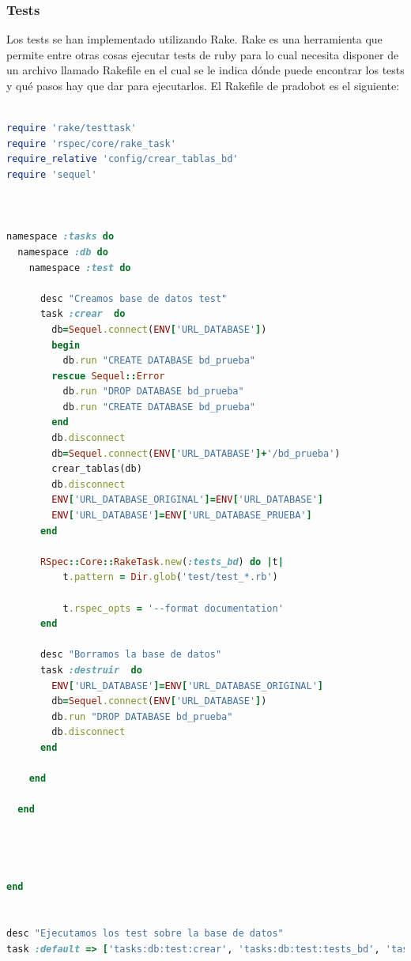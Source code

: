 \subsubsection{Tests}


Los tests se han implementado utilizando Rake. Rake es una herramienta que permite entre otras cosas ejecutar tests de ruby para lo cual necesita disponer de un archivo llamado Rakefile en el cual se le indica dónde puede encontrar los tests y qué pasos hay que dar para ejecutarlos. El Rakefile de pradobot es el siguiente:

\begin{lstlisting}[language=Ruby]

require 'rake/testtask'
require 'rspec/core/rake_task'
require_relative 'config/crear_tablas_bd'
require 'sequel'



namespace :tasks do
  namespace :db do
    namespace :test do

      desc "Creamos base de datos test"
      task :crear  do
        db=Sequel.connect(ENV['URL_DATABASE'])
        begin
          db.run "CREATE DATABASE bd_prueba"
        rescue Sequel::Error
          db.run "DROP DATABASE bd_prueba"
          db.run "CREATE DATABASE bd_prueba"
        end
        db.disconnect
        db=Sequel.connect(ENV['URL_DATABASE']+'/bd_prueba')
        crear_tablas(db)
        db.disconnect
        ENV['URL_DATABASE_ORIGINAL']=ENV['URL_DATABASE']
        ENV['URL_DATABASE']=ENV['URL_DATABASE_PRUEBA']
      end

      RSpec::Core::RakeTask.new(:tests_bd) do |t|
          t.pattern = Dir.glob('test/test_*.rb')

          t.rspec_opts = '--format documentation'
      end

      desc "Borramos la base de datos"
      task :destruir  do
        ENV['URL_DATABASE']=ENV['URL_DATABASE_ORIGINAL']
        db=Sequel.connect(ENV['URL_DATABASE'])
        db.run "DROP DATABASE bd_prueba"
        db.disconnect
      end

    end

  end




end


desc "Ejecutamos los test sobre la base de datos"
task :default => ['tasks:db:test:crear', 'tasks:db:test:tests_bd', 'tasks:db:test:destruir' ]
\end{lstlisting}

